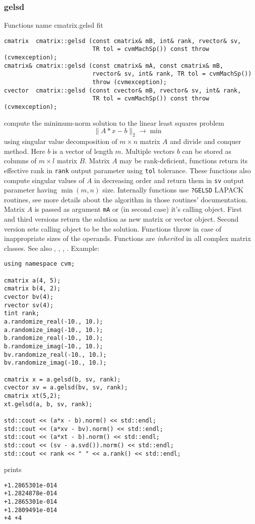\subsubsection{gelsd}
Functions%
\pdfdest name {cmatrix.gelsd} fit
\begin{verbatim}
cmatrix  cmatrix::gelsd (const cmatrix& mB, int& rank, rvector& sv,
                         TR tol = cvmMachSp()) const throw (cvmexception);
cmatrix& cmatrix::gelsd (const cmatrix& mA, const cmatrix& mB, 
                         rvector& sv, int& rank, TR tol = cvmMachSp()) 
                         throw (cvmexception);
cvector  cmatrix::gelsd (const cvector& mB, rvector& sv, int& rank,
                         TR tol = cvmMachSp()) const throw (cvmexception);
\end{verbatim}
compute the minimum-norm solution to the linear
least squares problem 
\begin{equation*}
\|A*x-b\|_2\to\min
\end{equation*}
using singular value decomposition of $m\times n$ matrix $A$
and divide and conquer method.
Here $b$ is a vector of length $m$.
Multiple vectors $b$ can be stored as columns of $m\times l$ matrix $B$.
Matrix $A$ may be rank-deficient, functions return its effective rank in \verb"rank"
output parameter using \verb"tol" tolerance. These functions also compute 
singular values of $A$ in decreasing order and return them in \verb"sv" output parameter
having $\min(m,n)$ size.
Internally functions use \verb"?GELSD" LAPACK routines, see more details
about the algorithm in those routines' documentation.
Matrix $A$ is passed as  argument \verb"mA" or (in second case) it's  calling object.
First and third versions return the solution as  new matrix or vector object.
Second version sets calling object to be the solution.
Functions throw
in case of inappropriate sizes of the operands.
Functions are \emph{inherited} in all complex matrix classes.
See also , ,
, .
Example:

\begin{Verbatim}
using namespace cvm;

cmatrix a(4, 5);
cmatrix b(4, 2);
cvector bv(4);
rvector sv(4);
tint rank;
a.randomize_real(-10., 10.);
a.randomize_imag(-10., 10.);
b.randomize_real(-10., 10.);
b.randomize_imag(-10., 10.);
bv.randomize_real(-10., 10.);
bv.randomize_imag(-10., 10.);

cmatrix x = a.gelsd(b, sv, rank);
cvector xv = a.gelsd(bv, sv, rank);
cmatrix xt(5,2);
xt.gelsd(a, b, sv, rank);

std::cout << (a*x - b).norm() << std::endl;
std::cout << (a*xv - bv).norm() << std::endl;
std::cout << (a*xt - b).norm() << std::endl;
std::cout << (sv - a.svd()).norm() << std::endl;
std::cout << rank << " " << a.rank() << std::endl;
\end{Verbatim}
prints
\begin{Verbatim}
+1.2865301e-014
+1.2824878e-014
+1.2865301e-014
+1.2809491e-014
+4 +4
\end{Verbatim}
\newpage





